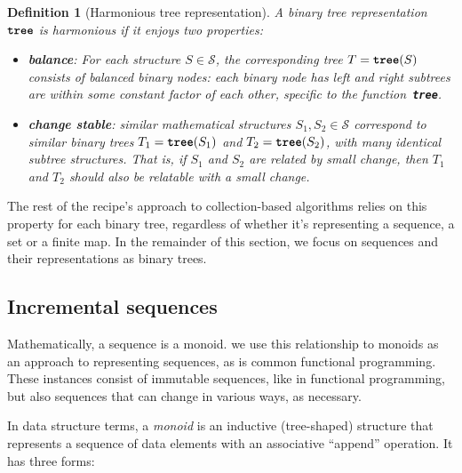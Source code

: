 \documentclass[11pt]{article}
\renewcommand{\ottkw}[1]{\textbf{\texttt{#1}}}
\newtheorem{definition}{Definition}
\begin{document}
\begin{definition}[Harmonious tree representation]
  \label{def:harmonious}
  A binary tree representation~$\ottkw{tree}$ is \emph{harmonious} if
  it enjoys two properties:
\begin{itemize}

\item \textbf{balance}: For each structure $S \in \mathcal{S}$, the
  corresponding tree $T = \ottkw{tree}(S)$ consists of \emph{balanced
  binary nodes}: each binary node has left and right subtrees are
  within some constant factor of each other, specific to the function~\ottkw{tree}.

\item \textbf{change stable}: similar mathematical structures $S_1,
  S_2 \in \mathcal{S}$ correspond to similar binary trees $T_1 =
  \ottkw{tree}(S_1)$ and $T_2 = \ottkw{tree}(S_2)$, with many
  identical subtree structures.  That is, if $S_1$ and $S_2$ are
  related by small change, then $T_1$ and $T_2$ should also be
  relatable with a small change.

\end{itemize}

\end{definition}

The rest of the recipe's approach to collection-based algorithms
relies on this property for each binary tree, regardless of
whether it's representing a sequence, a set or a finite map.
%
In the remainder of this section, we focus on sequences and their
representations as binary trees.

\subsection{Incremental sequences}

Mathematically, a sequence is a monoid.
%
we use this relationship to monoids as an approach to representing sequences,
as is common functional programming.
%
These instances consist of immutable sequences, like in functional programming,
but also sequences that can change in various ways, as necessary.

In data structure terms, a \emph{monoid} is an inductive (tree-shaped)
structure that represents a sequence of data elements with an associative ``append'' operation.
%
It has three forms:
\end{document}
